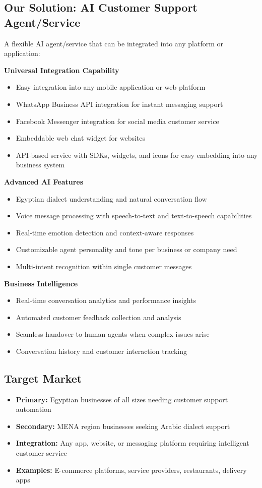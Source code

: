 \documentclass[12pt,a4paper]{article}
\begin{document}
\subsection*{Our Solution: AI Customer Support Agent/Service}
A flexible AI agent/service that can be integrated into any platform or application:

\textbf{Universal Integration Capability}
\begin{itemize}
    \item Easy integration into any mobile application or web platform
    \item WhatsApp Business API integration for instant messaging support
    \item Facebook Messenger integration for social media customer service
    \item Embeddable web chat widget for websites
    \item API-based service with SDKs, widgets, and icons for easy embedding into any business system
\end{itemize}

\textbf{Advanced AI Features}
\begin{itemize}
    \item Egyptian dialect understanding and natural conversation flow
    \item Voice message processing with speech-to-text and text-to-speech capabilities
    \item Real-time emotion detection and context-aware responses
    \item Customizable agent personality and tone per business or company need
    \item Multi-intent recognition within single customer messages
\end{itemize}

\textbf{Business Intelligence}
\begin{itemize}
    \item Real-time conversation analytics and performance insights
    \item Automated customer feedback collection and analysis
    \item Seamless handover to human agents when complex issues arise
    \item Conversation history and customer interaction tracking
\end{itemize}

\subsection*{Target Market}
\begin{itemize}
    \item \textbf{Primary:} Egyptian businesses of all sizes needing customer support automation
    \item \textbf{Secondary:} MENA region businesses seeking Arabic dialect support
    \item \textbf{Integration:} Any app, website, or messaging platform requiring intelligent customer service
    \item \textbf{Examples:} E-commerce platforms, service providers, restaurants, delivery apps
\end{itemize}
\end{document}
